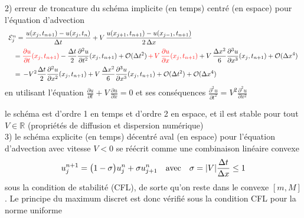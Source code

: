\documentclass[12pt,a4paper]{article}
\begin{document}
2) erreur de troncature du sch\'ema implicite (en temps) centr\'e (en espace) pour l'\'equation d'advection
$$
\begin{array}{l}
{\cal E}^n_j = \displaystyle \frac{u(x_j,t_{n+1}) - u(x_j,t_n)}{\Delta t} 
+ V\,\frac{u(x_{j+1},t_{n+1})-u(x_{j-1},t_{n+1})}{2\,\Delta x} \\[2ex]
  \quad = \displaystyle \textcolor{red}{ \frac{\partial u}{\partial t}(x_j,t_{n+1}) } - \frac{\Delta t}{2}
\frac{\partial^2 u}{\partial t^2}(x_j,t_{n+1}) + {\cal O}(\Delta t^2) \textcolor{red}{ \,+\, V\,\frac{\partial u}{\partial
  x}(x_j,t_{n+1}) } + V\,\frac{\Delta x^2}{6}\frac{\partial^3 u}{\partial
  x^3}(x_j,t_{n+1}) + {\cal O}(\Delta x^4) \\[2ex]
    \quad =\, \displaystyle - V^2 \frac{\Delta t}{2}
\frac{\partial^2 u}{\partial x^2}(x_j,t_{n+1}) + V\,\frac{\Delta x^2}{6}\frac{\partial^3 u}{\partial
  x^3}(x_j,t_{n+1}) + {\cal O}(\Delta t^2) + {\cal O}(\Delta x^4)
\end{array}
$$
en utilisant l'\'equation $\displaystyle \frac{\partial u}{\partial t} + V \,\frac{\partial u}{\partial x}=0$ et ses cons\'equences $\displaystyle \frac{\partial^2 u}{\partial t^2} = V^2 \frac{\partial^2 u}{\partial x^2}$

le sch\'ema est d'ordre 1 en temps et d'ordre 2 en espace, et il est stable pour tout $V\in \mathbb{R}$ (propri\'et\'es de diffusion et dispersion num\'erique)\\


3) le sch\'ema explicite (en temps) d\'ecentr\'e aval (en espace) pour l'\'equation d'advection avec vitesse $V<0$ se r\'e\'ecrit comme une combinaison lin\'eaire convexe
$$ u_j^{n+1} = \big( 1 - \sigma \big) u_j^n + \sigma u_{j+1}^n \quad {\rm avec} \quad \sigma = |V| \frac{\Delta t}{\Delta x} \leq 1 $$
sous la condition de stabilit\'e (CFL), de sorte qu'on reste dans le convexe $[m,M]$. 
Le principe du maximum discret est donc v\'erifi\'e sous la condition CFL pour la norme uniforme\\

\end{document}
